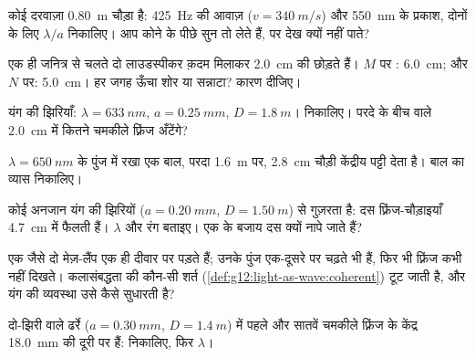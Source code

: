 \begin{exercise}[$\star$]\label{exo:g12:light-as-wave:3}
कोई दरवाज़ा \qty{0.80}{m} चौड़ा है: \qty{425}{Hz} की आवाज़ ($v = \qty{340}{m/s}$) और \qty{550}{nm} के प्रकाश,
दोनों के लिए $\lambda/a$ निकालिए। आप कोने के पीछे सुन तो लेते हैं, पर देख क्यों
नहीं पाते?
\end{exercise}

\begin{exercise}[$\star$]\label{exo:g12:light-as-wave:4}
एक ही जनित्र से चलते दो लाउडस्पीकर क़दम मिलाकर \qty{2.0}{cm} 
की  छोड़ते हैं। $M$ पर : \qty{6.0}{cm}; और $N$
पर: \qty{5.0}{cm}। हर जगह ऊँचा शोर या सन्नाटा? कारण दीजिए।
\end{exercise}

\begin{exercise}[$\star$]\label{exo:g12:light-as-wave:5}
यंग की झिरियाँ: $\lambda = \qty{633}{nm}$, $a = \qty{0.25}{mm}$, $D = \qty{1.8}{m}$।  निकालिए।
परदे के बीच वाले \qty{2.0}{cm} में कितने चमकीले फ़्रिंज अँटेंगे?
\end{exercise}

\begin{exercise}[$\star\star$]\label{exo:g12:light-as-wave:6}
$\lambda = \qty{650}{nm}$ के पुंज में रखा एक बाल, परदा \qty{1.6}{m} पर, \qty{2.8}{cm} चौड़ी केंद्रीय
पट्टी देता है। बाल का व्यास निकालिए।
\end{exercise}

\begin{exercise}[$\star\star$]\label{exo:g12:light-as-wave:7}
कोई अनजान  यंग की झिरियों ($a = \qty{0.20}{mm}$, $D = \qty{1.50}{m}$) से गुज़रता है: दस
फ़्रिंज-चौड़ाइयाँ \qty{4.7}{cm} में फैलती हैं। $\lambda$ और रंग बताइए। एक के
बजाय दस क्यों नापे जाते हैं?
\end{exercise}

\begin{exercise}[$\star\star$]\label{exo:g12:light-as-wave:8}
एक जैसे दो मेज़-लैंप एक ही दीवार पर पड़ते हैं; उनके पुंज एक-दूसरे पर चढ़ते भी
हैं, फिर भी फ़्रिंज कभी नहीं दिखते। कलासंबद्धता की कौन-सी शर्त
(\cref{def:g12:light-as-wave:coherent}) टूट जाती है, और यंग की व्यवस्था उसे कैसे सुधारती है?
\end{exercise}

\begin{exercise}[$\star\star$]\label{exo:g12:light-as-wave:9}
दो-झिरी वाले ढर्रे ($a = \qty{0.30}{mm}$, $D = \qty{1.4}{m}$) में पहले और सातवें चमकीले फ़्रिंज के
केंद्र \qty{18.0}{mm} की दूरी पर हैं:  निकालिए, फिर $\lambda$।
\end{exercise}

